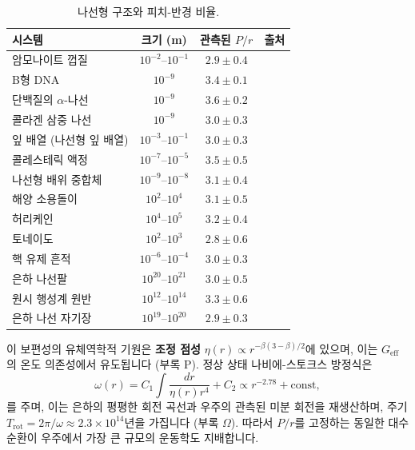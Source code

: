 \documentclass[11pt,a4paper]{article}
\begin{document}
	\begin{table}[H]
		\centering
		\caption{나선형 구조와 피치-반경 비율.}
		\label{tab:spiral-examples}
		\small
		\begin{tabular}{@{}l c c c@{}}
			\toprule
			시스템 & 크기 (m) & 관측된 \(P/r\) & 출처 \\
			\midrule
			암모나이트 껍질 & \(10^{-2}\)–\(10^{-1}\) & \(2.9 \pm 0.4\) & \cite{ammonites} \\
			B형 DNA & \(10^{-9}\) & \(3.4 \pm 0.1\) & \cite{watsoncrick} \\
			단백질의 \(\alpha\)-나선 & \(10^{-9}\) & \(3.6 \pm 0.2\) & \cite{pauling} \\
			콜라겐 삼중 나선 & \(10^{-9}\) & \(3.0 \pm 0.3\) & \cite{collagen} \\
			잎 배열 (나선형 잎 배열) & \(10^{-3}\)–\(10^{-1}\) & \(3.0 \pm 0.3\) & \cite{phyllotaxis} \\
			콜레스테릭 액정 & \(10^{-7}\)–\(10^{-5}\) & \(3.5 \pm 0.5\) & \cite{cholesteric} \\
			나선형 배위 중합체 & \(10^{-9}\)–\(10^{-8}\) & \(3.1 \pm 0.4\) & \cite{helical-mof} \\
			해양 소용돌이 & \(10^{2}\)–\(10^{4}\) & \(3.1 \pm 0.5\) & \cite{ocean-eddies} \\
			허리케인 & \(10^{4}\)–\(10^{5}\) & \(3.2 \pm 0.4\) & \cite{hurricanes} \\
			토네이도 & \(10^{2}\)–\(10^{3}\) & \(2.8 \pm 0.6\) & \cite{tornadoes} \\
			핵 유제 흔적 & \(10^{-6}\)–\(10^{-4}\) & \(3.0 \pm 0.3\) & \cite{nuclear-tracks} \\
			은하 나선팔 & \(10^{20}\)–\(10^{21}\) & \(3.0 \pm 0.5\) & \cite{binney-tremaine} \\
			원시 행성계 원반 & \(10^{12}\)–\(10^{14}\) & \(3.3 \pm 0.6\) & \cite{ppdisk} \\
			은하 나선 자기장 & \(10^{19}\)–\(10^{20}\) & \(2.9 \pm 0.3\) & \cite{beck} \\
			\bottomrule
		\end{tabular}
	\end{table}
	
	이 보편성의 유체역학적 기원은 \textbf{조정 점성} \(\eta(r) \propto r^{-\beta(3-\beta)/2}\)에 있으며, 이는 \(G_{\mathrm{eff}}\)의 온도 의존성에서 유도됩니다 (부록 P). 정상 상태 나비에-스토크스 방정식은
	\[
	\omega(r) = C_1 \int \frac{dr}{\eta(r) r^4} + C_2 \propto r^{-2.78} + \text{const},
	\]
	를 주며, 이는 은하의 평평한 회전 곡선과 우주의 관측된 미분 회전을 재생산하며, 주기 \(T_{\mathrm{rot}} = 2\pi/\omega \approx 2.3\times10^{14}\)년을 가집니다 (부록 \(\Omega\)). 따라서 \(P/r\)를 고정하는 동일한 대수 순환이 우주에서 가장 큰 규모의 운동학도 지배합니다.
	
\end{document}
